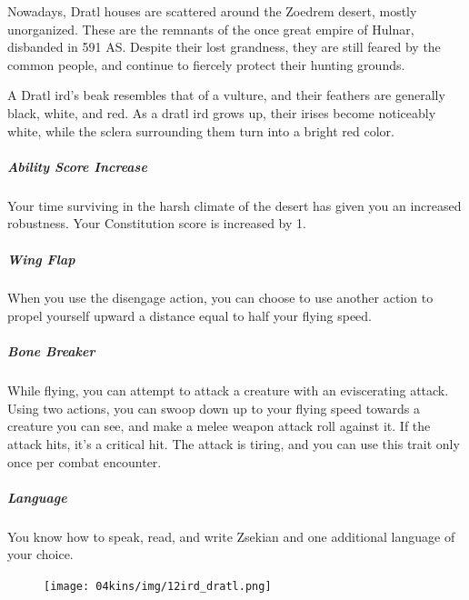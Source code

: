     Nowadays, Dratl houses are scattered around the Zoedrem desert, mostly unorganized.
    These are the remnants of the once great empire of Hulnar, disbanded in 591 AS.
    Despite their lost grandness, they are still feared by the common people, and continue to fiercely protect their hunting grounds.

    A Dratl ird's beak resembles that of a vulture, and their feathers are generally black, white, and red.
    As a dratl ird grows up, their irises become noticeably white, while the sclera surrounding them turn into a bright red color.

    \subparagraph{Ability Score Increase} Your time surviving in the harsh climate of the desert has given you an increased robustness.
    Your Constitution score is increased by 1.

    \subparagraph{Wing Flap} When you use the disengage action, you can choose to use another action to propel yourself upward a distance equal to half your flying speed.

    \subparagraph{Bone Breaker} While flying, you can attempt to attack a creature with an eviscerating attack.
    Using two actions, you can swoop down up to your flying speed towards a creature you can see, and make a melee weapon attack roll against it.
    If the attack hits, it's a critical hit.
    The attack is tiring, and you can use this trait only once per combat encounter.

    \subparagraph{Language} You know how to speak, read, and write Zsekian and one additional language of your choice.

\begin{figure}[!b]
    \centering
    \texttt{[image: 04kins/img/12ird\_dratl.png]}
\end{figure}


\newpage
